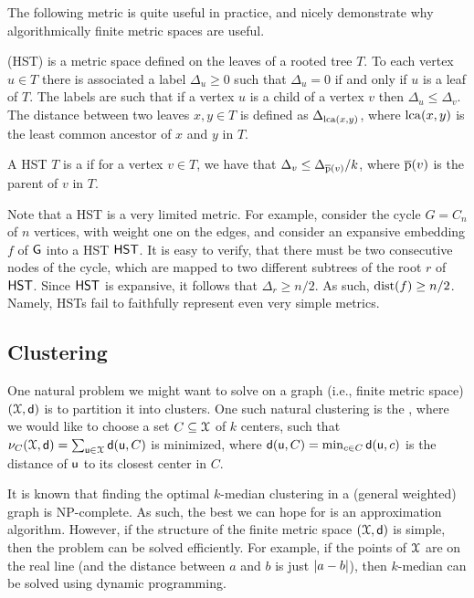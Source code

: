 The following metric is quite useful in practice, and nicely
demonstrate why algorithmically finite metric spaces are useful.
\begin{defn}
     (HST) is a metric space
    defined on the leaves of a rooted tree $T$. To each vertex $u\in
    T$ there is associated a label $\Delta_u \ge 0$ such that
    $\Delta_u=0$ if and only if $u$ is a leaf of $T$.  The labels are
    such that if a vertex $u$ is a child of a vertex $v$ then
    $\Delta_u\leq \Delta_v$. The distance between two leaves $x,y\in
    T$ is defined as $\Delta_{\operatorname{lca}(x,y)}$, where $\operatorname{lca}(x,y)$ is the
    least common ancestor of $x$ and $y$ in $T$.
    
    A HST $T$ is a  if for a vertex $v \in T$, we have
    that $\Delta_v \leq \Delta_{\overline{\mathrm{p}}(v)}/k$, where $\overline{\mathrm{p}}(v)$ is
    the parent of $v$ in $T$.

\end{defn}

Note that a HST is a very limited metric. For example, consider the
cycle $G = C_n$ of $n$ vertices, with weight one on the edges, and
consider an expansive embedding $f$ of $\mathsf{G}$ into a HST $\HST$. It is easy
to verify, that there must be two consecutive nodes of the cycle, which
are mapped to two different subtrees of the root $r$ of $\HST$. Since
$\HST$ is expansive, it follows that $\Delta_r \geq n/2$. As such,
$\mathrm{dist}(f) \geq n/2$. Namely, HSTs fail to faithfully represent even
very simple metrics.

 


\subsection{Clustering}

One natural problem we might want to solve on a graph (i.e., finite
metric space) $(\FMS,\DistChar)$ is to partition it into clusters. One
such natural clustering is the , where we
would like to choose a set $C \subseteq \FMS$ of $k$ centers, such
that
$\MdPrc_C(\FMS,\DistChar) = \sum_{\pntA \in \FMS} \DistChar(\pntA, C)$
is minimized, where
$\mathsf{d}(\mathsf{u},C) = \min_{c \in C} \mathsf{d}(\mathsf{u}, c)$ is the
distance of $\mathsf{u}$ to its closest center in $C$.

It is known that finding the optimal $k$-median clustering in a
(general weighted) graph is NP-complete. As such, the best we can hope
for is an approximation algorithm. However, if the structure of the
finite metric space $(\FMS,\DistChar)$ is simple, then the problem can be
solved efficiently. For example, if the points of $\FMS$ are on the
real line (and the distance between $a$ and $b$ is just
$\left| {a-b} \right|$), then $k$-median can be solved using dynamic
programming.

